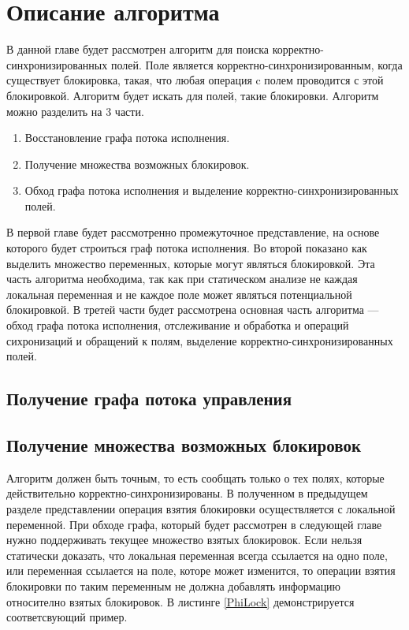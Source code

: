 \chapter{Описание алгоритма}


В данной главе будет рассмотрен алгоритм для поиска корректно-синхронизированных полей.
Поле является корректно-синхронизированным, когда существует блокировка, такая, что любая операция c полем проводится с этой блокировкой. Алгоритм будет искать для полей, такие блокировки. 
Алгоритм можно разделить на 3 части. 
\begin{enumerate}
\item Восстановление графа потока исполнения.
\item Получение множества возможных блокировок.
\item Обход графа потока исполнения и выделение корректно-синхронизированных полей.
\end{enumerate}

В первой главе будет рассмотренно промежуточное представление, на основе которого будет строиться граф потока исполнения. Во второй показано как выделить множество переменных, которые могут являться блокировкой. Эта часть алгоритма необходима, так как при статическом анализе не каждая локальная переменная и не каждое поле может являться потенциальной блокировкой. 
В третей части будет рассмотрена основная часть алгоритма --- обход графа потока исполнения, отслеживание и обработка и операций сихронизаций и обращений к полям, выделение корректно-синхронизированных полей.



\FloatBarrier
\section{Получение графа потока управления}


\FloatBarrier
\section{Получение множества возможных блокировок}
Алгоритм должен быть точным, то есть сообщать только о тех полях, которые действительно корректно-синхронизированы.
В полученном в предыдущем разделе представлении операция взятия блокировки осуществляется с локальной переменной. 
При обходе графа, который будет рассмотрен в следующей главе нужно поддерживать текущее множество взятых блокировок.
Если нельзя статически доказать, что локальная переменная всегда ссылается на одно поле, или переменная ссылается на поле, которе может изменится, то операции взятия блокировки по таким переменным не должна добавлять информацию относително взятых блокировок.
В листинге \ref{PhiLock} демонстрируется соответсвующий пример.

